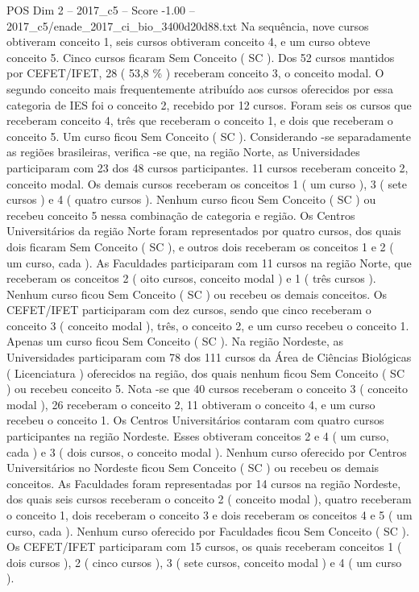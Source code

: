 \begin{textsample}{POS Dim 2 – 2017\_c5 – Score -1.00 – 2017\_c5/enade\_2017\_ci\_bio\_3400d20d88.txt}
Na sequência, nove cursos obtiveram conceito 1, seis cursos obtiveram conceito 4, e um curso obteve conceito 5.
Cinco cursos ficaram Sem Conceito ( SC ).
Dos 52 cursos mantidos por CEFET/IFET, 28 ( 53,8 \% ) receberam conceito 3, o conceito modal.
O segundo conceito mais frequentemente atribuído aos cursos oferecidos por essa categoria de IES foi o conceito 2, recebido por 12 cursos.
Foram seis os cursos que receberam conceito 4, três que receberam o conceito 1, e dois que receberam o conceito 5.
Um curso ficou Sem Conceito ( SC ).
Considerando -se separadamente as regiões brasileiras, verifica -se que, na região Norte, as Universidades participaram com 23 dos 48 cursos participantes. 11 cursos receberam conceito 2, conceito modal.
Os demais cursos receberam os conceitos 1 ( um curso ), 3 ( sete cursos ) e 4 ( quatro cursos ).
Nenhum curso ficou Sem Conceito ( SC ) ou recebeu conceito 5 nessa combinação de categoria e região.
Os Centros Universitários da região Norte foram representados por quatro cursos, dos quais dois ficaram Sem Conceito ( SC ), e outros dois receberam os conceitos 1 e 2 ( um curso, cada ).
As Faculdades participaram com 11 cursos na região Norte, que receberam os conceitos 2 ( oito cursos, conceito modal ) e 1 ( três cursos ).
Nenhum curso ficou Sem Conceito ( SC ) ou recebeu os demais conceitos.
Os CEFET/IFET participaram com dez cursos, sendo que cinco receberam o conceito 3 ( conceito modal ), três, o conceito 2, e um curso recebeu o conceito 1.
Apenas um curso ficou Sem Conceito ( SC ).
Na região Nordeste, as Universidades participaram com 78 dos 111 cursos da Área de Ciências Biológicas ( Licenciatura ) oferecidos na região, dos quais nenhum ficou Sem Conceito ( SC ) ou recebeu conceito 5.
Nota -se que 40 cursos receberam o conceito 3 ( conceito modal ), 26 receberam o conceito 2, 11 obtiveram o conceito 4, e um curso recebeu o conceito 1.
Os Centros Universitários contaram com quatro cursos participantes na região Nordeste.
Esses obtiveram conceitos 2 e 4 ( um curso, cada ) e 3 ( dois cursos, o conceito modal ).
Nenhum curso oferecido por Centros Universitários no Nordeste ficou Sem Conceito ( SC ) ou recebeu os demais conceitos.
As Faculdades foram representadas por 14 cursos na região Nordeste, dos quais seis cursos receberam o conceito 2 ( conceito modal ), quatro receberam o conceito 1, dois receberam o conceito 3 e dois receberam os conceitos 4 e 5 ( um curso, cada ).
Nenhum curso oferecido por Faculdades ficou Sem Conceito ( SC ).
Os CEFET/IFET participaram com 15 cursos, os quais receberam conceitos 1 ( dois cursos ), 2 ( cinco cursos ), 3 ( sete cursos, conceito modal ) e 4 ( um curso ).

\end{textsample}
